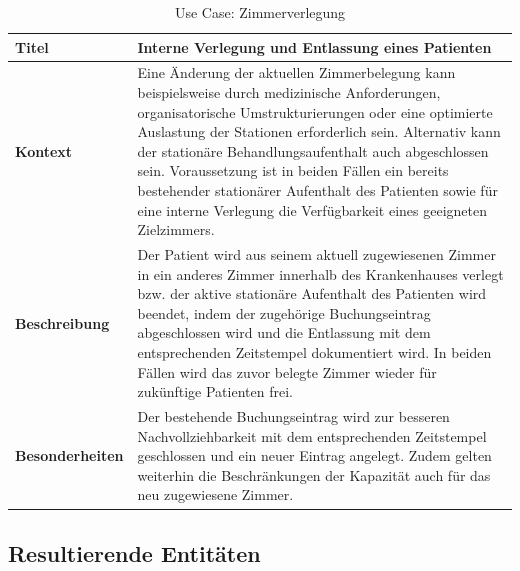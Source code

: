 \begin{table}[H]
\centering
\renewcommand{\arraystretch}{1.4}
\begin{tabularx}{\textwidth}{|p{4cm}|X|}
\hline
\textbf{Titel} & \textbf{Interne Verlegung und Entlassung eines Patienten} \\ \hline

\textbf{Kontext} & 
Eine Änderung der aktuellen Zimmerbelegung kann beispielsweise durch medizinische Anforderungen, organisatorische Umstrukturierungen oder eine optimierte Auslastung der Stationen erforderlich sein.
Alternativ kann der stationäre Behandlungsaufenthalt auch abgeschlossen sein.
Voraussetzung ist in beiden Fällen ein bereits bestehender stationärer Aufenthalt des Patienten sowie für eine interne Verlegung die Verfügbarkeit eines geeigneten Zielzimmers. \\ \hline

\textbf{Beschreibung} & 
Der Patient wird aus seinem aktuell zugewiesenen Zimmer in ein anderes Zimmer innerhalb des Krankenhauses verlegt bzw. der aktive stationäre Aufenthalt des Patienten wird beendet, indem der zugehörige Buchungseintrag abgeschlossen wird und die Entlassung mit dem entsprechenden Zeitstempel dokumentiert wird.
In beiden Fällen wird das zuvor belegte Zimmer wieder für zukünftige Patienten frei.  \\ \hline

\textbf{Besonderheiten} & 
Der bestehende Buchungseintrag wird zur besseren Nachvollziehbarkeit mit dem entsprechenden Zeitstempel geschlossen und ein neuer Eintrag angelegt. 
Zudem gelten weiterhin die Beschränkungen der Kapazität auch für das neu zugewiesene Zimmer.\\ \hline

\end{tabularx}
\caption{Use Case: Zimmerverlegung}
\end{table}

\newpage

\subsection*{Resultierende Entitäten}

